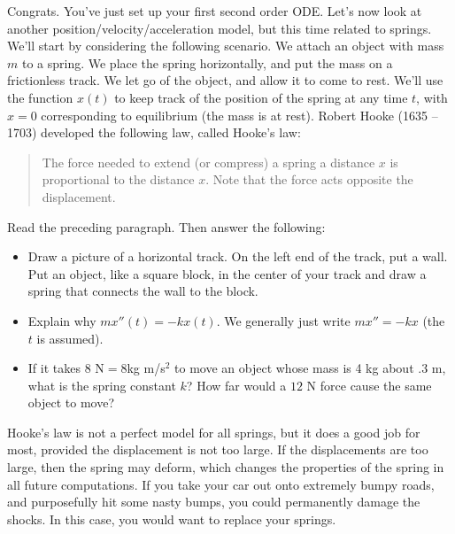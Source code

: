 Congrats.  You've just set up your first second order ODE. 
Let's now look at another position/velocity/acceleration model, but this time related to springs. 
We'll start by considering the following scenario. We attach an object with mass $m$ to a spring.  
We place the spring horizontally, and put the mass on a frictionless track. We let go of the object, and allow it to come to rest. We'll use the function $x(t)$ to keep track of the position of the spring at any time $t$, with $x=0$ corresponding to equilibrium (the mass is at rest). Robert Hooke (1635 -- 1703) developed the following law, called Hooke's law:
\begin{quote}
 The force needed to extend (or compress) a spring a distance $x$ is proportional to the distance $x$. Note that the force acts opposite the displacement.
\end{quote}
\begin{problem}
 Read the preceding paragraph.  Then answer the following:
\begin{itemize}
 \item Draw a picture of a horizontal track. On the left end of the track, put a wall. Put an object, like a square block, in the center of your track and draw a spring that connects the wall to the block.
 \item Explain why $mx''(t)=-kx(t)$. We generally just write $mx''=-kx$ (the $t$ is assumed).  
 \item If it takes $8 \text{ N} = 8$kg m/s$^2$ to move an object whose mass is 4 kg about $.3$ m, what is the spring constant $k$?  How far would a $12$ N force cause the same object to move? %
\end{itemize}
\end{problem}

Hooke's law is not a perfect model for all springs, but it does a good job for most, provided the displacement is not too large.  If the displacements are too large, then the spring may deform, which changes the properties of the spring in all future computations.  If you take your car out onto extremely bumpy roads, and purposefully hit some nasty bumps, you could permanently damage the shocks. In this case, you would want to replace your springs.

